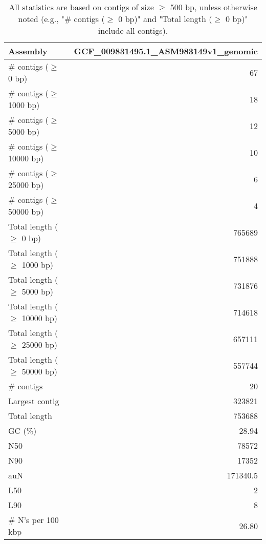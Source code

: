 \documentclass[12pt,a4paper]{article}
\begin{document}
\begin{table}[ht]
\begin{center}
\caption{All statistics are based on contigs of size $\geq$ 500 bp, unless otherwise noted (e.g., "\# contigs ($\geq$ 0 bp)" and "Total length ($\geq$ 0 bp)" include all contigs).}
\begin{tabular}{|l*{1}{|r}|}
\hline
Assembly & GCF\_009831495.1\_ASM983149v1\_genomic \\ \hline
\# contigs ($\geq$ 0 bp) & 67 \\ \hline
\# contigs ($\geq$ 1000 bp) & 18 \\ \hline
\# contigs ($\geq$ 5000 bp) & 12 \\ \hline
\# contigs ($\geq$ 10000 bp) & 10 \\ \hline
\# contigs ($\geq$ 25000 bp) & 6 \\ \hline
\# contigs ($\geq$ 50000 bp) & 4 \\ \hline
Total length ($\geq$ 0 bp) & 765689 \\ \hline
Total length ($\geq$ 1000 bp) & 751888 \\ \hline
Total length ($\geq$ 5000 bp) & 731876 \\ \hline
Total length ($\geq$ 10000 bp) & 714618 \\ \hline
Total length ($\geq$ 25000 bp) & 657111 \\ \hline
Total length ($\geq$ 50000 bp) & 557744 \\ \hline
\# contigs & 20 \\ \hline
Largest contig & 323821 \\ \hline
Total length & 753688 \\ \hline
GC (\%) & 28.94 \\ \hline
N50 & 78572 \\ \hline
N90 & 17352 \\ \hline
auN & 171340.5 \\ \hline
L50 & 2 \\ \hline
L90 & 8 \\ \hline
\# N's per 100 kbp & 26.80 \\ \hline
\end{tabular}
\end{center}
\end{table}
\end{document}
